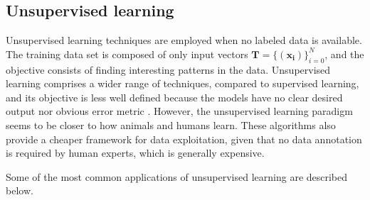 \subsection{Unsupervised learning}
Unsupervised learning techniques are employed when no labeled data is available. The training data set is composed of only input vectors $\mathbf{T}=\{(\mathbf{x_i})\}_{i=0}^{N}$, and the objective consists of finding interesting patterns in the data. Unsupervised learning comprises a wider range of techniques, compared to supervised learning, and its objective is less well defined because the models have no clear desired output nor obvious error metric \autocite{Goodfellow2016}. However, the unsupervised learning paradigm seems to be closer to how animals and humans learn. These algorithms also provide a cheaper framework for data exploitation, given that no data annotation is required by human experts, which is generally expensive.

Some of the most common applications of unsupervised learning are described below.

